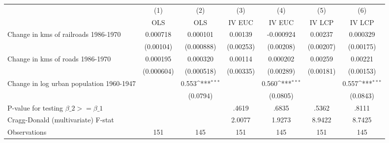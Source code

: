 {
\def\sym#1{\ifmmode^{#1}\else\(^{#1}\)\fi}
\begin{tabular}{l*{6}{c}}
\hline\hline
                &\multicolumn{1}{c}{(1)}&\multicolumn{1}{c}{(2)}&\multicolumn{1}{c}{(3)}&\multicolumn{1}{c}{(4)}&\multicolumn{1}{c}{(5)}&\multicolumn{1}{c}{(6)}\\
                &\multicolumn{1}{c}{OLS}&\multicolumn{1}{c}{OLS}&\multicolumn{1}{c}{IV EUC}&\multicolumn{1}{c}{IV EUC}&\multicolumn{1}{c}{IV LCP}&\multicolumn{1}{c}{IV LCP}\\
\hline
Change in kms of railroads 1986-1970& 0.000718         & 0.000101         &  0.00139         &-0.000924         &  0.00237         & 0.000329         \\
                &(0.00104)         &(0.000888)         &(0.00253)         &(0.00208)         &(0.00207)         &(0.00175)         \\
[1em]
Change in kms of roads 1986-1970& 0.000195         & 0.000320         &  0.00114         & 0.000202         &  0.00259         &  0.00221         \\
                &(0.000604)         &(0.000518)         &(0.00335)         &(0.00289)         &(0.00181)         &(0.00153)         \\
[1em]
Change in log urban population 1960-1947&                  &    0.553\sym{***}&                  &    0.560\sym{***}&                  &    0.557\sym{***}\\
                &                  & (0.0794)         &                  & (0.0805)         &                  & (0.0843)         \\
\hline
P-value for testing $\beta\_{2} >= \beta\_{1}$&                  &                  &    .4619         &    .6835         &    .5362         &    .8111         \\
Cragg-Donald (multivariate) F-stat&                  &                  &   2.0077         &   1.9273         &   8.9422         &   8.7425         \\
Observations    &      151         &      145         &      151         &      145         &      151         &      145         \\
\hline\hline
\end{tabular}
}
